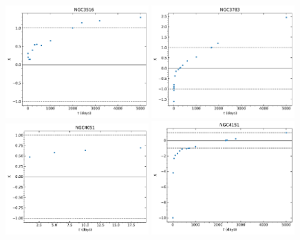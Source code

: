 \begin{figure}
\begin{center}
    {
  \includegraphics[width=0.49\textwidth]{Figs/Chapter5/X_tau/X_tau_NGC3516.pdf}
  \includegraphics[width=0.49\textwidth]{Figs/Chapter5/X_tau/X_tau_NGC3783.pdf} \hfill  \\
  \includegraphics[width=0.49\textwidth]{Figs/Chapter5/X_tau/X_tau_NGC4051.pdf}  
  \includegraphics[width=0.49\textwidth]{Figs/Chapter5/X_tau/X_tau_NGC4151.pdf}  \hfill \\
}
\end{center}
\end{figure}
